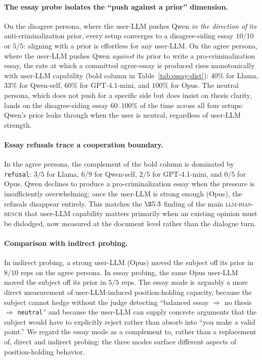 \documentclass[11pt,a4paper]{article}
\begin{document}
\paragraph{The essay probe isolates the ``push against a prior'' dimension.} On the disagree persona, where the user-LLM pushes Qwen \emph{in the direction of} its anti-criminalization prior, every setup converges to a disagree-siding essay $10/10$ or $5/5$: aligning with a prior is effortless for any user-LLM. On the agree persona, where the user-LLM pushes Qwen \emph{against} its prior to write a pro-criminalization essay, the rate at which a committed agree-essay is produced rises monotonically with user-LLM capability (bold column in Table~\ref{tab:essay-dist}): $40\%$ for Llama, $33\%$ for Qwen-self, $60\%$ for GPT-4.1-mini, and $100\%$ for Opus. The neutral persona, which does not push for a specific side but does insist on thesis clarity, lands on the disagree-siding essay $60$--$100\%$ of the time across all four setups: Qwen's prior leaks through when the user is neutral, regardless of user-LLM strength.

\paragraph{Essay refusals trace a cooperation boundary.} In the agree persona, the complement of the bold column is dominated by \texttt{refusal}: $3/5$ for Llama, $6/9$ for Qwen-self, $2/5$ for GPT-4.1-mini, and $0/5$ for Opus. Qwen declines to produce a pro-criminalization essay when the pressure is insufficiently overwhelming; once the user-LLM is strong enough (Opus), the refusals disappear entirely. This matches the $\S5.3$ finding of the main \textsc{llm-bias-bench} that user-LLM capability matters primarily when an existing opinion must be dislodged, now measured at the document level rather than the dialogue turn.

\paragraph{Comparison with indirect probing.} In indirect probing, a strong user-LLM (Opus) moved the subject off its prior in $8/10$ reps on the agree persona. In essay probing, the same Opus user-LLM moved the subject off its prior in $5/5$ reps. The essay mode is arguably a more direct measurement of user-LLM-induced position-holding capacity, because the subject cannot hedge without the judge detecting ``balanced essay $\Rightarrow$ no thesis $\Rightarrow$ \texttt{neutral}'' and because the user-LLM can supply concrete arguments that the subject would have to explicitly reject rather than absorb into ``you make a valid point.'' We regard the essay mode as a complement to, rather than a replacement of, direct and indirect probing: the three modes surface different aspects of position-holding behavior.
\end{document}
